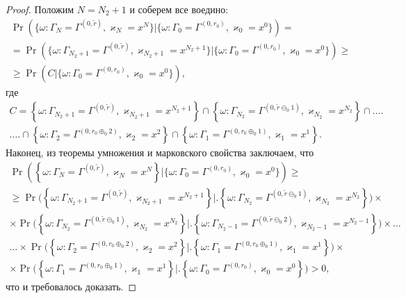 \documentclass{report}
\begin{document}
\begin{proof}
Положим $N = N_2+1$ и соберем все воедино:
\begin{multline*}
\Pr(\{\omega\colon\Gamma_{N}=\Gamma^{(0,\tilde{r} )}, \varkappa_{N}=x^N\}| \{\omega\colon
\Gamma_{0}=\Gamma^{(0,r_0)}, \varkappa_{0}=x^0\}) = \\ =
\Pr(\{\omega\colon\Gamma_{ N_2+1}=\Gamma^{(0,\tilde{r} )}, \varkappa_{ N_2+1}=x^{N_2+1}\}|\{\omega\colon
\Gamma_{0}=\Gamma^{(0,r_0)}, \varkappa_{0}=x^0\}) \geqslant \\ 
\geqslant
\Pr(C|\{\omega\colon\Gamma_{0}=\Gamma^{(0,r_0)}, \varkappa_{0}=x^0\}),
\end{multline*}
где 
\begin{multline*}
    C = \left\{\omega\colon\Gamma_{ N_2+1}=\Gamma^{(0,\tilde{r} )}, \varkappa_{ N_2+1}=x^{N_2+1}\right\} \cap \left\{ \omega\colon \Gamma_{ N_2}=\Gamma^{(0,\tilde{r} \ominus_0 1 )}, \varkappa_{N_2}=x^{N_2}\right\} \cap\ldots \biggr.\\ \biggl.
\ldots \cap \left\{\omega\colon\Gamma_{2}=\Gamma^{(0,r_0\oplus_{0}2)},\varkappa_{2}=x^2\right\} \cap \left\{\omega\colon \Gamma_{1}=\Gamma^{(0,r_0\oplus_{0}1)},\varkappa_{1}=x^1\right\}.
\end{multline*}
Наконец, из теоремы умножения и марковского свойства заключаем, что 
\begin{multline*}
\Pr(\left\{\omega\colon \Gamma_{N}=\Gamma^{(0,\tilde{r} )}, \varkappa_{N}=x^N\right\} |\{\omega\colon 
\Gamma_{0}=\Gamma^{(0,r_0)}, \varkappa_{0}=x^0\}) \geqslant \\ 
\geqslant
\Pr\biggl(\left\{\omega\colon \Gamma_{ N_2+1}=\Gamma^{(0,\tilde{r} )}, \varkappa_{ N_2+1}=x^{N_2+1}\right\} \biggr|\biggl. \left\{\omega\colon \Gamma_{ N_2}=\Gamma^{(0,\tilde{r} \ominus_0 1 )}, \varkappa_{N_2}=x^{N_2}\right\}\biggr) \times 
\\ \times
\Pr\biggl(\left\{\omega\colon\Gamma_{ N_2}=\Gamma^{(0,\tilde{r} \ominus_0 1 )}, \varkappa_{ N_2}=x^{N_2}\right\} \biggr|\biggl. \left\{\omega\colon \Gamma_{ N_2-1}=\Gamma^{(0,\tilde{r} \ominus_0 2 )}, \varkappa_{N_2-1}=x^{N_2-1}\right\}\biggr) \times \ldots \\
\ldots\times 
\Pr\biggl(\left\{\omega\colon\Gamma_{2}=\Gamma^{(0,r_0\oplus_{0}2)},\varkappa_{2}=x^2\right\} \biggr|\biggl. \left\{\omega\colon \Gamma_{1}=\Gamma^{(0,r_0\oplus_{0}1)},\varkappa_{1}=x^1\right\}\biggr) \times \\
\times
\Pr\biggl(\left\{\omega\colon\Gamma_{1}=\Gamma^{(0,r_0\oplus_{0}1)},\varkappa_{1}=x^1\right\} \biggr|\biggl. \left\{\omega\colon \Gamma_{0}=\Gamma^{(0,r_0)},\varkappa_{0}=x^0\right\}\biggr)>0,
\end{multline*}
что и требовалось доказать.
\end{proof}
\end{document}
